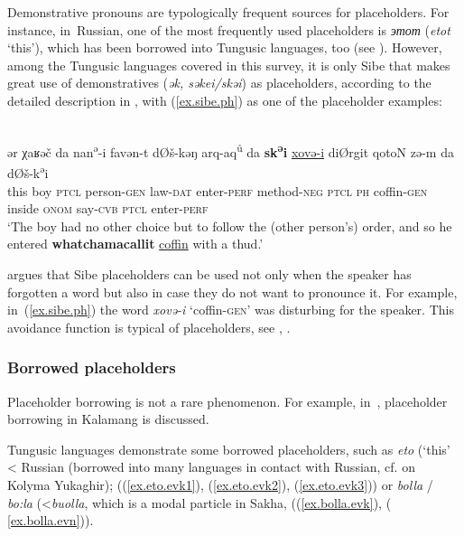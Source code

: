 \documentclass[output=paper,colorlinks,citecolor=brown
\ChapterDOI{10.5281/zenodo.15697577}
]{langscibook}
\begin{document}
Demonstrative pronouns are typologically frequent sources for placeholders. For instance, in~Russian, one of the most frequently used placeholders is \textit{этот} (\textit{etot} `this'), which has been borrowed into Tungusic languages, too (see ). However, among the Tungusic languages covered in this survey, it is only Sibe that makes great use of demonstratives (\textit{ək, səkei/skəi}) as placeholders, according to the detailed description in \citet{zikmundova2013spoken}, with (\ref{ex.sibe.ph}) as one of the placeholder examples:


 \ea \label{ex.sibe.ph}
 \\
\gll ər χaʁəč da nan\textsuperscript{ə}-i favən-t dØš-kəŋ arq-aq\textsuperscript{ů} da \textbf{sk\textsuperscript{ə}i} \uline{xovə-i} diØrgit qotoN zə-m da dØš-k\textsuperscript{ə}i\\
this boy \textsc{ptcl} person-\textsc{gen} law-\textsc{dat} enter-\textsc{perf} method-\textsc{neg} \textsc{ptcl} \textsc{ph}
coffin-\textsc{gen} inside \textsc{onom} say-\textsc{cvb} \textsc{ptcl} enter-\textsc{perf}\\
 \glt `The boy had no other choice but to follow the (other person’s) order, and so he entered \textbf{whatchamacallit} \uline{coffin} with a thud.'
 \z
{}

\citet{zikmundova2013spoken} argues that Sibe placeholders can be used not only when the speaker has forgotten a word but also in case they do not want to pronounce it. For example, in~(\ref{ex.sibe.ph}) the word \textit{xovə-i} `coffin-\textsc{gen}' was disturbing for the speaker. This avoidance function is typical of placeholders, see \citet{cheung2015uttering}, \citet{seraku2024placeholders}.


\subsubsection{Borrowed placeholders}
\label{Borrowed_placeholders}
Placeholder borrowing is not a rare phenomenon. For example, in~\citet{chapters/visser}, placeholder borrowing in Kalamang is discussed.

Tungusic languages demonstrate some borrowed placeholders, such as \textit{eto} (`this' < Russian (borrowed into many languages in contact with Russian, cf. \citealt{chapters/ventayol_boada} on Kolyma Yukaghir); ((\ref{ex.eto.evk1}), (\ref{ex.eto.evk2}), (\ref{ex.eto.evk3})) or \textit{bolla} / \textit{bo:la} (<\textit{buolla}, which is a modal particle in Sakha, ((\ref{ex.bolla.evk}), ( \ref{ex.bolla.evn})).
\end{document}

